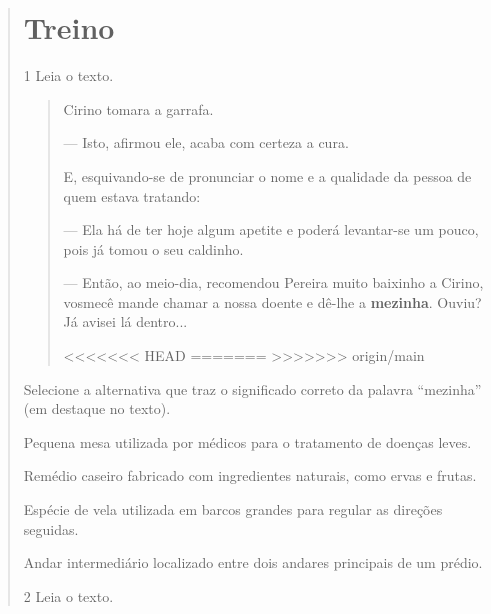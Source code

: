 \begin{quote}
\section{Treino}

\num{1} Leia o texto.

\begin{quote}
Cirino tomara a garrafa.

--- Isto, afirmou ele, acaba com certeza a cura.

E, esquivando-se de pronunciar o nome e a qualidade da pessoa de quem
estava tratando:

--- Ela há de ter hoje algum apetite e poderá levantar-se um pouco, pois
já tomou o seu caldinho.

--- Então, ao meio-dia, recomendou Pereira muito baixinho a Cirino,
vosmecê mande chamar a nossa doente e dê-lhe a \textbf{mezinha}. Ouviu?
Já avisei lá dentro...

<<<<<<< HEAD
=======
>>>>>>> origin/main
\end{quote}

Selecione a alternativa que traz o significado correto da palavra “mezinha” (em destaque no texto).

\begin{escolha}
\item Pequena mesa utilizada por médicos para o tratamento de doenças leves.

\item Remédio caseiro fabricado com ingredientes naturais, como ervas e frutas.

\item Espécie de vela utilizada em barcos grandes para regular as direções seguidas.

\item Andar intermediário localizado entre dois andares principais de um prédio.
\end{escolha}


\num{2} Leia o texto.


\end{quote}
